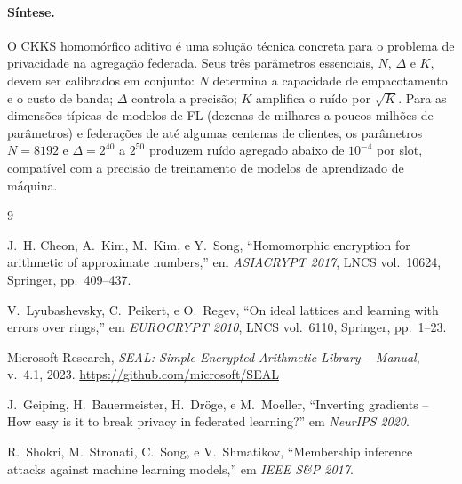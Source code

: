 \documentclass[11pt,a4paper]{article}
\begin{document}
\paragraph{Síntese.}
O CKKS homomórfico aditivo é uma solução técnica concreta para o problema de privacidade
na agregação federada. Seus três parâmetros essenciais, $N$, $\Delta$ e $K$, devem ser
calibrados em conjunto: $N$ determina a capacidade de empacotamento e o custo de banda;
$\Delta$ controla a precisão; $K$ amplifica o ruído por $\sqrt{K}$. Para as dimensões
típicas de modelos de FL (dezenas de milhares a poucos milhões de parâmetros) e federações
de até algumas centenas de clientes, os parâmetros $N=8192$ e $\Delta=2^{40}$ a $2^{50}$
produzem ruído agregado abaixo de $10^{-4}$ por slot, compatível com a precisão de
treinamento de modelos de aprendizado de máquina.

\begin{thebibliography}{9}

J.~H. Cheon, A.~Kim, M.~Kim, e Y.~Song,
``Homomorphic encryption for arithmetic of approximate numbers,''
em \emph{ASIACRYPT 2017}, LNCS vol.~10624, Springer, pp.~409--437.

V.~Lyubashevsky, C.~Peikert, e O.~Regev,
``On ideal lattices and learning with errors over rings,''
em \emph{EUROCRYPT 2010}, LNCS vol.~6110, Springer, pp.~1--23.

Microsoft Research,
\emph{SEAL: Simple Encrypted Arithmetic Library -- Manual}, v.~4.1, 2023.
\url{https://github.com/microsoft/SEAL}

J.~Geiping, H.~Bauermeister, H.~Dröge, e M.~Moeller,
``Inverting gradients -- How easy is it to break privacy in federated learning?''
em \emph{NeurIPS 2020}.

R.~Shokri, M.~Stronati, C.~Song, e V.~Shmatikov,
``Membership inference attacks against machine learning models,''
em \emph{IEEE S\&P 2017}.

\end{thebibliography}
\end{document}
